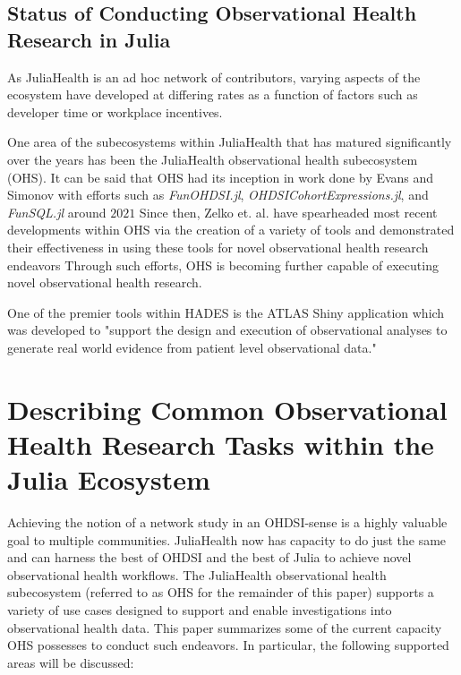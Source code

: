 \documentclass{juliacon}
\begin{document}
\subsection{Status of Conducting Observational Health Research in Julia}

As JuliaHealth is an ad hoc network of contributors, varying aspects of the ecosystem have developed at differing rates as a function of factors such as developer time or workplace incentives.

One area of the subecosystems within JuliaHealth that has matured significantly over the years has been the JuliaHealth observational health subecosystem (OHS).
It can be said that OHS had its inception in work done by Evans and Simonov with efforts such as \textit{FunOHDSI.jl}, \textit{OHDSICohortExpressions.jl}, and \textit{FunSQL.jl} around $2021$ \cite{kirill_simonov_2023_7705325}
Since then, Zelko et. al. have spearheaded most recent developments within OHS via the creation of a variety of tools and demonstrated their effectiveness in using these tools for novel observational health research endeavors \cite{zelko2022pilot}
Through such efforts, OHS is becoming further capable of executing novel observational health research. 


One of the premier tools within HADES is the ATLAS Shiny application which was developed to "support the design and execution of observational analyses to generate real world evidence from patient level observational data."

\section{Describing Common Observational Health Research Tasks within the Julia Ecosystem}

Achieving the notion of a network study in an OHDSI-sense is a highly valuable goal to multiple communities.
JuliaHealth now has capacity to do just the same and can harness the best of OHDSI and the best of Julia to achieve novel observational health workflows.
The JuliaHealth observational health subecosystem (referred to as OHS for the remainder of this paper) supports a variety of use cases designed to support and enable investigations into observational health data.
This paper summarizes some of the current capacity OHS possesses to conduct such endeavors.
In particular, the following supported areas will be discussed:
\end{document}
